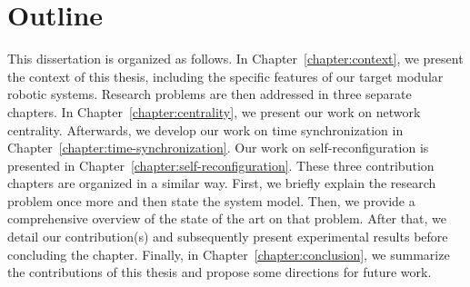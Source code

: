 \section{Outline}

This dissertation is organized as follows. In Chapter~\ref{chapter:context}, we present the context of this thesis, including the specific features of our target modular robotic systems. Research problems are then addressed in three separate chapters. In Chapter~\ref{chapter:centrality}, we present our work on network centrality. Afterwards, we develop our work on time synchronization in Chapter~\ref{chapter:time-synchronization}. Our work on self-reconfiguration is presented in Chapter~\ref{chapter:self-reconfiguration}. These three contribution chapters are organized in a similar way. First, we briefly explain the research problem once more and then state the system model. Then, we provide a comprehensive overview of the state of the art on that problem. After that, we detail our contribution(s) and subsequently present experimental results before concluding the chapter. Finally, in Chapter~\ref{chapter:conclusion}, we summarize the contributions of this thesis and propose some directions for future work.